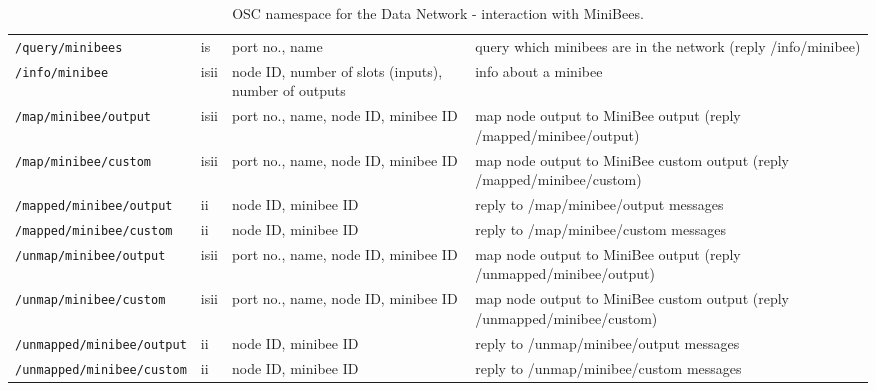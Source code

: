 \documentclass[letterpaper,10pt]{article}
\begin{document}
\begin{sidewaystable}[!tbp]
\small
\begin{center}
\begin{tabular}{|llll|}
\hline
\verb|/query/minibees| & is & port no., name& query which minibees are in the network (reply /info/minibee) \\
\verb|/info/minibee| & isii & node ID, number of slots (inputs), number of outputs & info about a minibee \\
\verb|/map/minibee/output| & isii & port no., name, node ID, minibee ID & map node output to MiniBee output (reply /mapped/minibee/output)\\
\verb|/map/minibee/custom| & isii & port no., name, node ID, minibee ID & map node output to MiniBee custom output (reply /mapped/minibee/custom)\\
\verb|/mapped/minibee/output| & ii & node ID, minibee ID & reply to /map/minibee/output messages \\
\verb|/mapped/minibee/custom| & ii & node ID, minibee ID & reply to /map/minibee/custom messages \\
\verb|/unmap/minibee/output| & isii & port no., name, node ID, minibee ID & map node output to MiniBee output (reply /unmapped/minibee/output)\\
\verb|/unmap/minibee/custom| & isii & port no., name, node ID, minibee ID & map node output to MiniBee custom output (reply /unmapped/minibee/custom)\\
\verb|/unmapped/minibee/output| & ii & node ID, minibee ID & reply to /unmap/minibee/output messages \\
\verb|/unmapped/minibee/custom| & ii & node ID, minibee ID & reply to /unmap/minibee/custom messages \\
\hline
\end{tabular}
\end{center}
\caption{OSC namespace for the Data Network - interaction with MiniBees. }
\label{oscinterfaceMB}
\end{sidewaystable}
\end{document}

